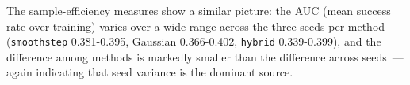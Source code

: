 The sample-efficiency measures show a similar picture: the AUC (mean success rate over training) varies over a wide range across the three seeds per method (\texttt{smoothstep} 0.381-0.395, Gaussian 0.366-0.402, \texttt{hybrid} 0.339-0.399), and the difference among methods is markedly smaller than the difference across seeds~--- again indicating that seed variance is the dominant source.
